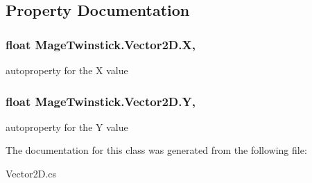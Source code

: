 \subsection{Property Documentation}
\hypertarget{class_mage_twinstick_1_1_vector2_d_ac750d49285ebcd4e4bb81295f91ab600}{}
\subsubsection[{X}]{\setlength{\rightskip}{0pt plus 5cm}float Mage\+Twinstick.\+Vector2\+D.\+X\hspace{0.3cm}{\ttfamily [get]}, {\ttfamily [set]}}\label{class_mage_twinstick_1_1_vector2_d_ac750d49285ebcd4e4bb81295f91ab600}


autoproperty for the X value 

\hypertarget{class_mage_twinstick_1_1_vector2_d_a0ae54e599156e7c295515bfc80834bfd}{}
\subsubsection[{Y}]{\setlength{\rightskip}{0pt plus 5cm}float Mage\+Twinstick.\+Vector2\+D.\+Y\hspace{0.3cm}{\ttfamily [get]}, {\ttfamily [set]}}\label{class_mage_twinstick_1_1_vector2_d_a0ae54e599156e7c295515bfc80834bfd}


autoproperty for the Y value 



The documentation for this class was generated from the following file\+:\begin{DoxyCompactItemize}
\item 
Vector2\+D.\+cs\end{DoxyCompactItemize}
